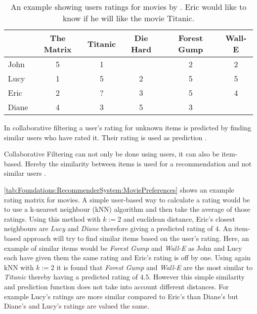 \begin{table}[tb]
    \centering    
    \begin{tabular}{ l | c | c | c | c | c }
        & The Matrix & Titanic & Die Hard & Forest Gump & Wall-E \\ \hline
         John  & 5 & 1 &   & 2 & 2 \\
         Lucy  & 1 & 5 & 2 & 5 & 5 \\
         Eric  & 2 & ? & 3 & 5 & 4 \\
         Diane & 4 & 3 & 5 & 3 &   \\
    \end{tabular}
    \caption[Movies: Rating Matrix]{An example showing users ratings for movies by \citeauthor{ningComprehensiveSurveyNeighborhoodBased2015} \cite{ningComprehensiveSurveyNeighborhoodBased2015}. Eric would like to know if he will like the movie Titanic.}  
    \label{tab:Foundations:RecommenderSystem:MoviePreferences}
\end{table}

In collaborative filtering a user's rating for unknown items is predicted by finding similar users who have rated it. Their rating is used as prediction \cite[~ pp. 7, 8]{felfernigDecisionTasksBasic2018}.

Collaborative Filtering can not only be done using users, it can also be item-based. Hereby the similarity between items is used for a recommendation and not similar users \cite{ricciRecommenderSystemsHandbook2015}.

\autoref{tab:Foundations:RecommenderSystem:MoviePreferences} shows an example rating matrix for movies. A simple user-based way to calculate a rating would be to use a k-nearest neighbour (kNN) algorithm and then take the average of those ratings. Using this method with $k := 2$ and euclidean distance, Eric's closest neighbours are \textit{Lucy} and \textit{Diane} therefore giving a predicted rating of $4$. An item-based approach will try to find similar items based on the user's rating. Here, an example of similar items would be \textit{Forest Gump} and \textit{Wall-E} as John and Lucy each have given them the same rating and Eric's rating is off by one. Using again kNN with $k := 2$ it is found that \textit{Forest Gump} and \textit{Wall-E} are the most similar to \textit{Titanic} thereby having a predicted rating of $4.5$. However this simple similarity and prediction function does not take into account different distances. For example Lucy's ratings are more similar compared to Eric's than Diane's but Diane's and Lucy's ratings are valued the same.

